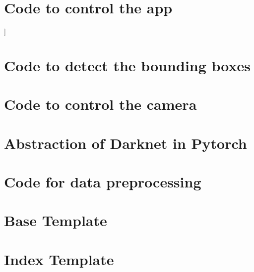 \section{Code to control the app}]\label{ap:app}


\pagebreak

\section{Code to detect the bounding boxes}\label{ap:bbox}


\section{Code to control the camera}\label{ap:camera}


\section{Abstraction of Darknet in Pytorch}\label{ap:darknet}


\pagebreak
\section{Code for data preprocessing}\label{ap:preprocess}


\pagebreak
\section{Base Template}\label{ap:template1}



\pagebreak
\section{Index Template}\label{ap:template2}

